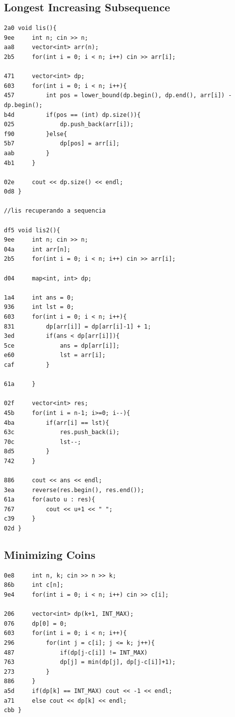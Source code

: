 \documentclass[11pt, a4paper, twoside]{article}
\begin{document}
\subsection{Longest Increasing Subsequence}
\begin{lstlisting}
2a0 void lis(){
9ee     int n; cin >> n;
aa8     vector<int> arr(n);
2b5     for(int i = 0; i < n; i++) cin >> arr[i];
     
471     vector<int> dp;
603     for(int i = 0; i < n; i++){
457         int pos = lower_bound(dp.begin(), dp.end(), arr[i]) - dp.begin();
b4d         if(pos == (int) dp.size()){
025             dp.push_back(arr[i]);
f90         }else{
5b7             dp[pos] = arr[i];
aab         }
4b1     }
     
02e     cout << dp.size() << endl;
0d8 }

//lis recuperando a sequencia

df5 void lis2(){
9ee     int n; cin >> n;
04a     int arr[n];
2b5     for(int i = 0; i < n; i++) cin >> arr[i];
    
d04     map<int, int> dp; 
    
1a4     int ans = 0; 
936     int lst = 0;
603     for(int i = 0; i < n; i++){
831         dp[arr[i]] = dp[arr[i]-1] + 1;
3ed         if(ans < dp[arr[i]]){
5ce             ans = dp[arr[i]];
e60             lst = arr[i]; 
caf         }
           
61a     }
    
02f     vector<int> res;
45b     for(int i = n-1; i>=0; i--){
4ba         if(arr[i] == lst){
63c             res.push_back(i);
70c             lst--;
8d5         }
742     }
    
886     cout << ans << endl;
3ea     reverse(res.begin(), res.end());
61a     for(auto u : res){
767         cout << u+1 << " ";
c39     }
02d }
\end{lstlisting}

\subsection{Minimizing Coins}
\begin{lstlisting}
0e8     int n, k; cin >> n >> k;
86b     int c[n];
9e4     for(int i = 0; i < n; i++) cin >> c[i];
 
206     vector<int> dp(k+1, INT_MAX);
076     dp[0] = 0;
603     for(int i = 0; i < n; i++){
296         for(int j = c[i]; j <= k; j++){
487             if(dp[j-c[i]] != INT_MAX)
763             dp[j] = min(dp[j], dp[j-c[i]]+1);
273         }
886     }
a5d     if(dp[k] == INT_MAX) cout << -1 << endl;
a71     else cout << dp[k] << endl;
cbb }
\end{lstlisting}
\end{document}
